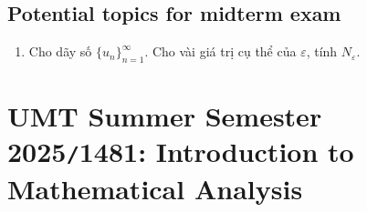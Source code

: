 \documentclass{article}
\begin{document}

\subsection{Potential topics for midterm exam}

\begin{enumerate}
	\item Cho dãy số $\{u_n\}_{n=1}^\infty$. Cho vài giá trị cụ thể của $\varepsilon$, tính $N_\varepsilon$.
\end{enumerate}


\section{UMT Summer Semester 2025{\tt/}1481: Introduction to Mathematical Analysis}
\end{document}
